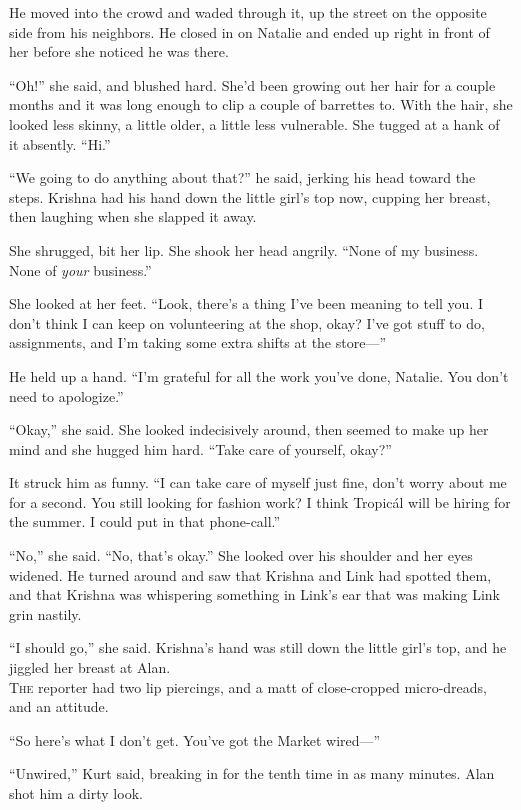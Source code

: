 He moved into the crowd and waded through it, up the street on the
opposite side from his neighbors.  He closed in on Natalie and ended
up right in front of her before she noticed he was there.

``Oh!'' she said, and blushed hard.  She'd been growing out her hair
for a couple months and it was long enough to clip a couple of
barrettes to.  With the hair, she looked less skinny, a little older,
a little less vulnerable.  She tugged at a hank of it absently. 
``Hi.''

``We going to do anything about that?'' he said, jerking his head
toward the steps.  Krishna had his hand down the little girl's top
now, cupping her breast, then laughing when she slapped it away.

She shrugged, bit her lip.  She shook her head angrily.  ``None of my
business.  None of \textit{your} business.''

She looked at her feet.  ``Look, there's a thing I've been meaning to
tell you.  I don't think I can keep on volunteering at the shop, okay? 
I've got stuff to do, assignments, and I'm taking some extra shifts at
the store---''

He held up a hand.  ``I'm grateful for all the work you've done,
Natalie.  You don't need to apologize.''

``Okay,'' she said.  She looked indecisively around, then seemed to
make up her mind and she hugged him hard.  ``Take care of yourself,
okay?''

It struck him as funny.  ``I can take care of myself just fine, don't
worry about me for a second.  You still looking for fashion work?  I
think Tropic\'{a}l will be hiring for the summer.  I could put in that
phone-call.''

``No,'' she said.  ``No, that's okay.'' She looked over his shoulder
and her eyes widened.  He turned around and saw that Krishna and Link
had spotted them, and that Krishna was whispering something in Link's
ear that was making Link grin nastily.

``I should go,'' she said.  Krishna's hand was still down the little
girl's top, and he jiggled her breast at Alan.
\\
\lettrine[lines=3, lhang=.5, nindent=0pt, findent=2pt]{T}{he} reporter had two lip piercings, and a matt of close-cropped
micro-dreads, and an attitude.

``So here's what I don't get.  You've got the Market wired---''

``Unwired,'' Kurt said, breaking in for the tenth time in as many
minutes.  Alan shot him a dirty look.

